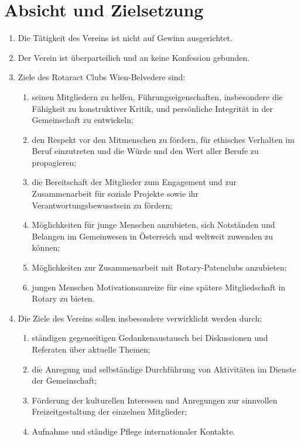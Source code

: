 \documentclass{article}
\begin{document}
\section{Absicht und Zielsetzung}
\begin{enumerate}
    \item Die Tätigkeit des Vereins ist nicht auf Gewinn ausgerichtet.
    \item Der Verein ist überparteilich und an keine Konfession gebunden.
    \item Ziele des Rotaract Clubs Wien-Belvedere sind:
    \begin{enumerate}
        \item seinen Mitgliedern zu helfen, Führungseigenschaften, insbesondere die Fähigkeit zu konstruktiver Kritik, und persönliche Integrität in der Gemeinschaft zu entwickeln;
        \item den Respekt vor den Mitmenschen zu fördern, für ethisches Verhalten im Beruf einzutreten und die Würde und den Wert aller Berufe zu propagieren;
        \item die Bereitschaft der Mitglieder zum Engagement und zur Zusammenarbeit für soziale Projekte sowie ihr Verantwortungsbewusstsein zu fördern;
        \item Möglichkeiten für junge Menschen anzubieten, sich Notständen und Belangen im Gemeinwesen in Österreich und weltweit zuwenden zu können;
        \item Möglichkeiten zur Zusammenarbeit mit Rotary-Patenclubs anzubieten;
        \item jungen Menschen Motivationsanreize für eine spätere Mitgliedschaft in Rotary zu bieten.
    \end{enumerate}
    \item Die Ziele des Vereins sollen insbesondere verwirklicht werden durch:
    \begin{enumerate}
        \item ständigen gegenseitigen Gedankenaustausch bei Diskussionen und Referaten über aktuelle Themen;
        \item die Anregung und selbständige Durchführung von Aktivitäten im Dienste der Gemeinschaft;
        \item Förderung der kulturellen Interessen und Anregungen zur sinnvollen Freizeitgestaltung der einzelnen Mitglieder;
    \item Aufnahme und ständige Pflege internationaler Kontakte.
    \end{enumerate}
\end{enumerate}
\end{document}
